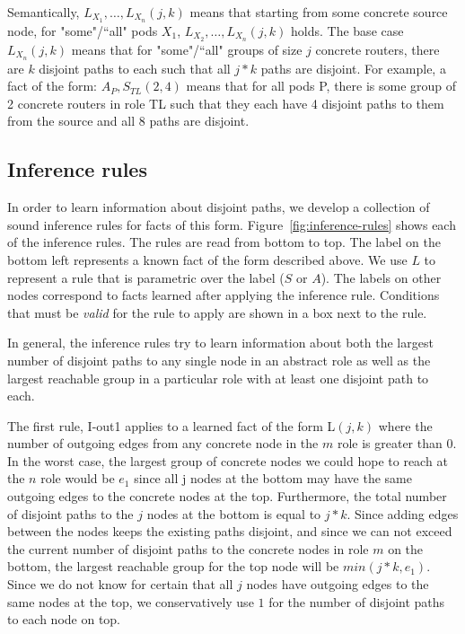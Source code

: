 \documentclass[numbers, 10pt, preprint]{sigplanconf}
\begin{document}
Semantically, $L_{X_1}, \ldots, L_{X_n}(j,k)$ means that starting from some concrete source node, for "some"/``all" pods $X_1$, $L_{X_2}, \ldots, L_{X_n}(j,k)$ holds. The base case $L_{X_n}(j,k)$ means that for "some"/``all" groups of size $j$ concrete routers, there are $k$ disjoint paths to each such that all $j*k$ paths are disjoint.
%
For example, a fact of the form: $A_P, S_{TL}(2,4)$ means that for all pods P, there is some group of 2 concrete routers in role TL such that they each have 4 disjoint paths to them from the source and all 8 paths are disjoint.

\subsection{Inference rules}

\newcommand{\infrule}[1]{{\small \sf #1}\xspace}

In order to learn information about disjoint paths, we develop a collection of sound inference rules for facts of this form. Figure~\ref{fig:inference-rules} shows each of the inference rules. The rules are read from bottom to top. The label on the bottom left represents a known fact of the form described above. We use $L$ to represent a rule that is parametric over the label ($S$ or $A$). The labels on other nodes correspond to facts learned after applying the inference rule. Conditions that must be \emph{valid} for the rule to apply are shown in a box next to the rule.

In general, the inference rules try to learn information about both the largest number of disjoint paths to any single node in an abstract role as well as the largest reachable group in a particular role with at least one disjoint path to each.

The first rule, \infrule{I-out1} applies to a learned fact of the form L$(j,k)$ where the number of outgoing edges from any concrete node in the $m$ role is greater than 0. In the worst case, the largest group of concrete nodes we could hope to reach at the $n$ role would be $e_1$ since all j nodes at the bottom may have the same outgoing edges to the concrete nodes at the top. Furthermore, the total number of disjoint paths to the $j$ nodes at the bottom is equal to $j*k$. Since adding edges between the nodes keeps the existing paths disjoint, and since we can not exceed the current number of disjoint paths to the concrete nodes in role $m$ on the bottom, the largest reachable group for the top node will be $min(j*k,e_1)$. Since we do not know for certain that all $j$ nodes have outgoing edges to the same nodes at the top, we conservatively use $1$ for the number of disjoint paths to each node on top.
\end{document}
